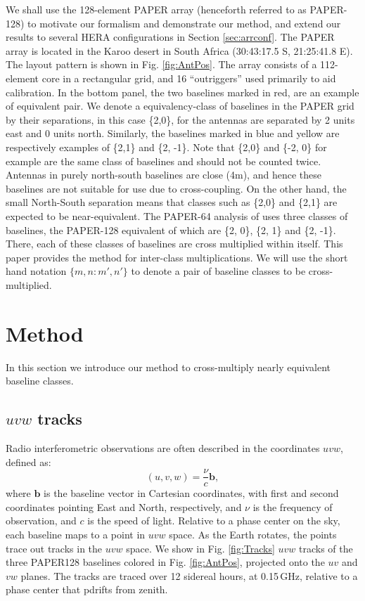 \documentclass[twocolumn,apj,numberedappendix]{emulateapj}
\renewcommand\[{\begin{equation}}
\renewcommand\]{\end{equation}}
\begin{document}
We shall use the 128-element PAPER array (henceforth referred to as PAPER-128) to motivate our formalism and demonstrate our method, and extend our results to several HERA configurations in Section \ref{sec:arrconf}. 
The PAPER array is located in the Karoo desert in South Africa (30:43:17.5
S, 21:25:41.8 E). The layout pattern is shown
in Fig. \ref{fig:AntPos}. The array consists of a 112-element core in a rectangular grid, and 16 ``outriggers'' used primarily to aid calibration.  In the bottom panel, the two baselines marked in red, are an example of equivalent pair. We denote a equivalency-class of baselines in the PAPER grid by their separations, in this case  \{2,0\}, for the
antennas are separated by 2 units east and 0 units north. Similarly,
the baselines marked in blue and yellow are respectively examples
of \{2,1\} and \{2, -1\}.
Note that \{2,0\} and \{-2, 0\} for example are the same class of baselines and should not be counted twice. Antennas in purely north-south baselines
are close (4m), and hence these baselines are not suitable
for use due to cross-coupling. On the other hand, the small North-South separation means that classes such as \{2,0\} and  \{2,1\} are expected to be near-equivalent. The PAPER-64 analysis of \cite{Ali2015} uses three classes of baselines, the PAPER-128
equivalent of which are 
\{2, 0\}, \{2, 1\} and \{2, -1\}. There, each of these classes
of baselines are cross multiplied within itself. This paper provides the method for inter-class multiplications. We will use the short hand notation $\{m,n:m',n'\}$ to denote a pair of baseline classes to be cross-multiplied. 


\section{Method \label{sec:method}}\label{sec:method}

In this section we introduce our method to cross-multiply nearly equivalent baseline classes. 

\subsection{$uvw$ tracks \label{sec:tracks}}


Radio interferometric observations are often described in the coordinates $uvw$, defined as:
\[
(u, v, w) = \frac{\nu}{c}\boldsymbol{b}, 
\]
where $\boldsymbol{b}$ is the baseline vector in Cartesian coordinates, with first and second coordinates pointing East and North, respectively, and  $\nu$ is the frequency of observation, and $c$ is the speed of light. 
Relative to a phase center on the sky, each baseline maps to a point in $uvw$ space. As the Earth rotates, the points trace out tracks in the $uvw$ space. 
We show in Fig. \ref{fig:Tracks} $uvw$ tracks of the three PAPER128 baselines colored in Fig. \ref{fig:AntPos}, projected onto the $uv$ and $vw$ planes. The tracks are traced over 12 sidereal hours, at 0.15\,GHz, relative to a phase center that pdrifts from zenith. 
\end{document}
